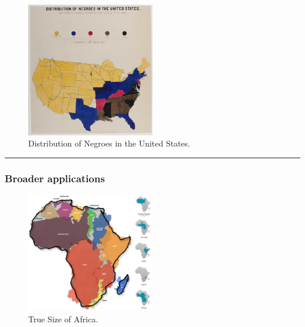 \documentclass[
  letterpaper,
  DIV=11,
  numbers=noendperiod]{scrartcl}
\begin{document}
\begin{figure}

{\centering \includegraphics[width=0.5\textwidth,height=\textheight]{w1d2e.jpg}

}

\caption{Distribution of Negroes in the United States.}

\end{figure}

\begin{center}\rule{0.5\linewidth}{0.5pt}\end{center}

\hypertarget{broader-applications}{%
\subsubsection{Broader applications}\label{broader-applications}}

\begin{figure}

{\centering \includegraphics[width=0.5\textwidth,height=\textheight]{true-size-of-africa.jpg}

}

\caption{True Size of Africa.}

\end{figure}
\end{document}
